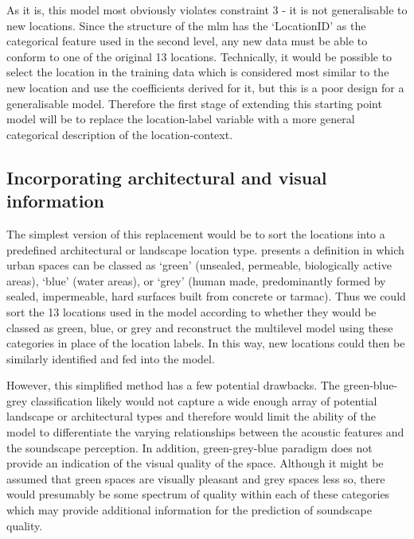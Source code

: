 As it is, this model most obviously violates constraint 3 - it is not generalisable to new locations. Since the structure of the \gls{mlm} has the `LocationID' as the categorical feature used in the second level, any new data must be able to conform to one of the original 13 locations. Technically, it would be possible to select the location in the training data which is considered most similar to the new location and use the coefficients derived for it, but this is a poor design for a generalisable model. Therefore the first stage of extending this starting point model will be to replace the location-label variable with a more general categorical description of the location-context. 

\subsection{Incorporating architectural and visual information}

The simplest version of this replacement would be to sort the locations into a predefined architectural or landscape location type. \citet{Suligowski2021Quantity} presents a definition in which urban spaces can be classed as `green' (unsealed, permeable, biologically active areas), `blue' (water areas), or `grey' (human made, predominantly formed by sealed, impermeable, hard surfaces built from concrete or tarmac). Thus we could sort the 13 locations used in the model according to whether they would be classed as green, blue, or grey and reconstruct the multilevel model using these categories in place of the location labels. In this way, new locations could then be similarly identified and fed into the model. 

However, this simplified method has a few potential drawbacks. The green-blue-grey classification likely would not capture a wide enough array of potential landscape or architectural types and therefore would limit the ability of the model to differentiate the varying relationships between the acoustic features and the soundscape perception. In addition, green-grey-blue paradigm does not provide an indication of the visual quality of the space. Although it might be assumed that green spaces are visually pleasant and grey spaces less so, there would presumably be some spectrum of quality within each of these categories which may provide additional information for the prediction of soundscape quality. 

